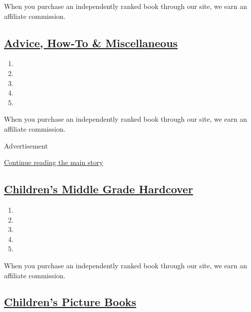 When you purchase an independently ranked book through our site, we earn
an affiliate commission.

\hypertarget{advice-how-to--miscellaneous}{%
\subsection{\texorpdfstring{\href{/books/best-sellers/2020/08/02/advice-how-to-and-miscellaneous/}{Advice,
How-To \&
Miscellaneous}}{Advice, How-To \& Miscellaneous}}\label{advice-how-to--miscellaneous}}

\begin{enumerate}
\def\labelenumi{\arabic{enumi}.}
\tightlist
\item
\item
\item
\item
\item
\end{enumerate}

When you purchase an independently ranked book through our site, we earn
an affiliate commission.

Advertisement

\protect\hyperlink{after-mid2}{Continue reading the main story}

\hypertarget{childrens-middle-grade-hardcover}{%
\subsection{\texorpdfstring{\href{/books/best-sellers/2020/08/02/childrens-middle-grade-hardcover/}{Children's
Middle Grade
Hardcover}}{Children's Middle Grade Hardcover}}\label{childrens-middle-grade-hardcover}}

\begin{enumerate}
\def\labelenumi{\arabic{enumi}.}
\tightlist
\item
\item
\item
\item
\item
\end{enumerate}

When you purchase an independently ranked book through our site, we earn
an affiliate commission.

\hypertarget{childrens-picture-books}{%
\subsection{\texorpdfstring{\href{/books/best-sellers/2020/08/02/picture-books/}{Children's
Picture
Books}}{Children's Picture Books}}\label{childrens-picture-books}}

